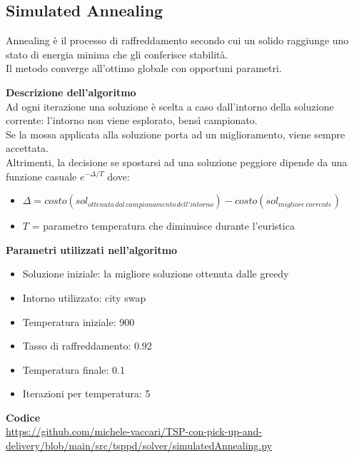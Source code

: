 \documentclass[9pt]{beamer}
\begin{document}
\subsection{Simulated Annealing}
\begin{frame}{\subsecname}

	Annealing è il processo di raffreddamento secondo cui un solido raggiunge uno stato di energia minima che gli conferisce stabilità. \\
	Il metodo converge all’ottimo globale con opportuni parametri.

	\textbf{Descrizione dell'algoritmo} \\
	Ad ogni iterazione una soluzione è scelta a caso dall’intorno della soluzione corrente: l’intorno non viene esplorato, bensì campionato. \\
	Se la mossa applicata alla soluzione porta ad un miglioramento, viene sempre accettata. \\
	Altrimenti, la decisione se spostarsi ad una soluzione peggiore dipende da una funzione casuale $e^{-\Delta / T}$ dove:
	\begin{itemize}
		\item
		$\Delta = costo(sol_{ottenuta\,dal\,campionamento\,dell'intorno}) - costo(sol_{migliore\,corrente})$
		\item
		$T$ = parametro temperatura che diminuisce durante l'euristica
	\end{itemize}

\framebreak

	\textbf{Parametri utilizzati nell'algoritmo}
	\begin{itemize}
		\item
		Soluzione iniziale: la migliore soluzione ottenuta dalle greedy
		\item
		Intorno utilizzato: city swap
		\item
		Temperatura iniziale: 900
		\item
		Tasso di raffreddamento: 0.92
		\item
		Temperatura finale: 0.1
		\item
		Iterazioni per temperatura: 5
	\end{itemize}

	\textbf{Codice} \\
	\href{https://github.com/michele-vaccari/TSP-con-pick-up-and-delivery/blob/main/src/tsppd/solver/simulatedAnnealing.py}{https://github.com/michele-vaccari/TSP-con-pick-up-and-delivery/blob/main/src/tsppd/solver/simulatedAnnealing.py}


\end{frame}
\end{document}

